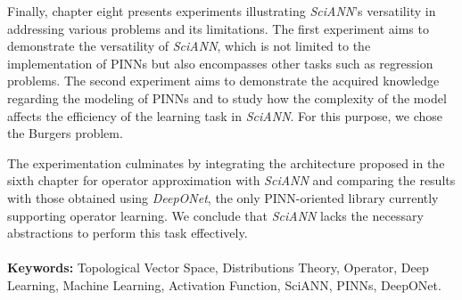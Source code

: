 Finally, chapter eight presents experiments illustrating \textit{SciANN}'s versatility in addressing various problems and its limitations. The first experiment aims to demonstrate the versatility of \textit{SciANN}, which is not limited to the implementation of PINNs but also encompasses other tasks such as regression problems. The second experiment aims to demonstrate the acquired knowledge regarding the modeling of PINNs and to study how the complexity of the model affects the efficiency of the learning task in \textit{SciANN}. For this purpose, we chose the Burgers problem. 

The experimentation culminates by integrating the architecture proposed in the sixth chapter for operator approximation with \textit{SciANN} and comparing the results with those obtained using \textit{DeepONet}, the only PINN-oriented library currently supporting operator learning. We conclude that \textit{SciANN} lacks the necessary abstractions to perform this task effectively.\\\\

\textbf{Keywords: } Topological Vector Space, Distributions Theory, Operator, Deep Learning, Machine Learning, Activation Function, SciANN, PINNs, DeepONet. 

\endinput
